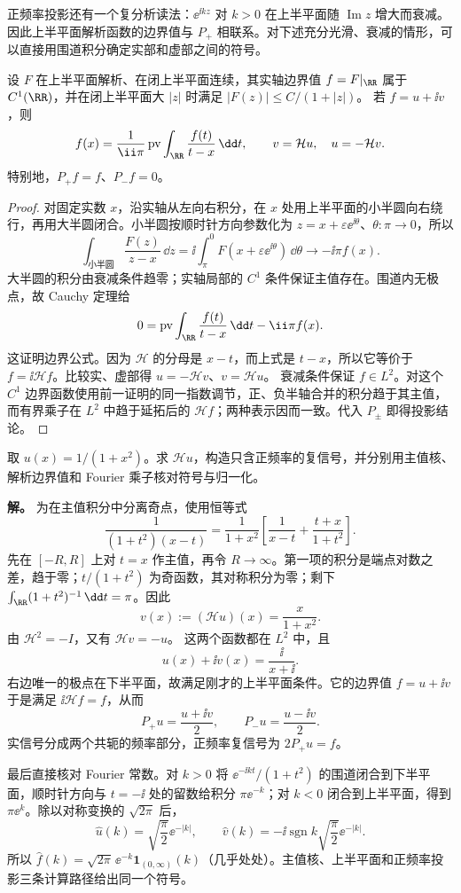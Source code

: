 正频率投影还有一个复分析读法：$\ee^{\ii kz}$ 对 $k>0$ 在上半平面随 $\operatorname{Im}z$ 增大而衰减。因此上半平面解析函数的边界值与 $P_+$ 相联系。对下述充分光滑、衰减的情形，可以直接用围道积分确定实部和虚部之间的符号。
\begin{proposition}[上半平面边界值的共轭关系]
设 $F$ 在上半平面解析、在闭上半平面连续，其实轴边界值 $f=F|_{\RR}$ 属于 $C^1(\RR)$，并在闭上半平面大 $|z|$ 时满足 $|F(z)|\le C/(1+|z|)$。
若 $f=u+\ii v$，则
\[
f(x)=\frac1{\ii\pi}\operatorname{pv}\int_{\RR}\frac{f(t)}{t-x}\,\dd t,
\qquad v=\mathcal Hu,\quad u=-\mathcal Hv.
\]
特别地，$P_+f=f$、$P_-f=0$。
\end{proposition}
\begin{proof}
对固定实数 $x$，沿实轴从左向右积分，在 $x$ 处用上半平面的小半圆向右绕行，再用大半圆闭合。小半圆按顺时针方向参数化为 $z=x+\varepsilon \ee^{\ii\theta}$、$\theta:\pi\to0$，所以
\[
\int_{\text{小半圆}}\frac{F(z)}{z-x}\,\dd z
=\ii\int_\pi^0F(x+\varepsilon \ee^{\ii\theta})\,\dd\theta
\longrightarrow-\ii\pi f(x).
\]
大半圆的积分由衰减条件趋零；实轴局部的 $C^1$ 条件保证主值存在。围道内无极点，故 Cauchy 定理给
\[
0=\operatorname{pv}\int_{\RR}\frac{f(t)}{t-x}\,\dd t-\ii\pi f(x).
\]
这证明边界公式。因为 $\mathcal H$ 的分母是 $x-t$，而上式是 $t-x$，所以它等价于 $f=\ii\mathcal Hf$。比较实、虚部得 $u=-\mathcal Hv$、$v=\mathcal Hu$。
衰减条件保证 $f\in L^2$。对这个 $C^1$ 边界函数使用前一证明的同一指数调节，正、负半轴合并的积分趋于其主值，而有界乘子在 $L^2$ 中趋于延拓后的 $\mathcal Hf$；两种表示因而一致。代入 $P_\pm$ 即得投影结论。
\end{proof}

\begin{workedexample}
取 $u(x)=1/(1+x^2)$。求 $\mathcal Hu$，构造只含正频率的复信号，并分别用主值核、解析边界值和 Fourier 乘子核对符号与归一化。

\textbf{解。} 为在主值积分中分离奇点，使用恒等式
\[
\frac1{(1+t^2)(x-t)}
=\frac1{1+x^2}\left[\frac1{x-t}+\frac{t+x}{1+t^2}\right].
\]
先在 $[-R,R]$ 上对 $t=x$ 作主值，再令 $R\to\infty$。第一项的积分是端点对数之差，趋于零；$t/(1+t^2)$ 为奇函数，其对称积分为零；剩下 $\int_{\RR}(1+t^2)^{-1}\,\dd t=\pi$。因此
\[
v(x):=(\mathcal Hu)(x)=\frac{x}{1+x^2}.
\]
由 $\mathcal H^2=-I$，又有 $\mathcal Hv=-u$。
这两个函数都在 $L^2$ 中，且
\[
u(x)+\ii v(x)=\frac{\ii}{x+\ii}.
\]
右边唯一的极点在下半平面，故满足刚才的上半平面条件。它的边界值 $f=u+\ii v$ 于是满足 $\ii\mathcal Hf=f$，从而
\[
P_+u=\frac{u+\ii v}{2},\qquad P_-u=\frac{u-\ii v}{2}.
\]
实信号分成两个共轭的频率部分，正频率复信号为 $2P_+u=f$。

最后直接核对 Fourier 常数。对 $k>0$ 将 $\ee^{-\ii kt}/(1+t^2)$ 的围道闭合到下半平面，顺时针方向与 $t=-\ii$ 处的留数给积分 $\pi \ee^{-k}$；对 $k<0$ 闭合到上半平面，得到 $\pi \ee^k$。除以对称变换的 $\sqrt{2\pi}$ 后，
\[
\widehat u(k)=\sqrt{\frac\pi2}\ee^{-|k|},\qquad
\widehat v(k)=-\ii\operatorname{sgn}k\sqrt{\frac\pi2}\ee^{-|k|}.
\]
所以 $\widehat f(k)=\sqrt{2\pi}\,\ee^{-k}\mathbf1_{(0,\infty)}(k)$（几乎处处）。主值核、上半平面和正频率投影三条计算路径给出同一个符号。
\end{workedexample}

